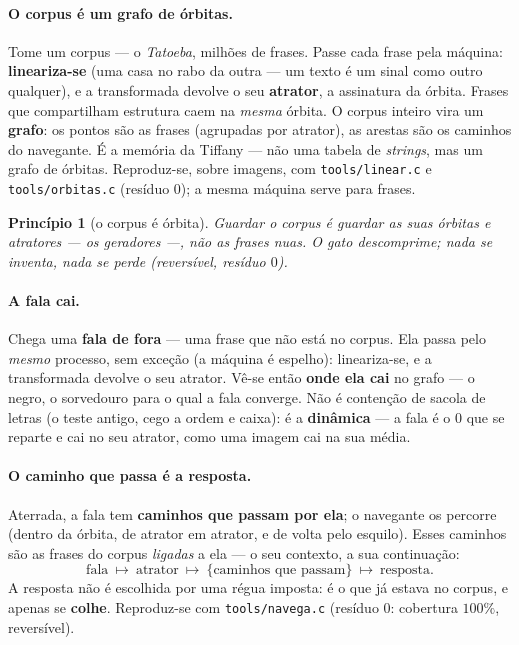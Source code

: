 \documentclass[11pt]{article}
\newcommand{\code}[1]{\texttt{\small #1}}
\theoremstyle{plain}
\newtheorem{principio}{Princípio}
\theoremstyle{remark}
\begin{document}
\paragraph{O corpus é um grafo de órbitas.} Tome um corpus --- o \emph{Tatoeba}, milhões de frases.
Passe cada frase pela máquina: \textbf{lineariza-se} (uma casa no rabo da outra --- um texto é um
sinal como outro qualquer), e a transformada devolve o seu \textbf{atrator}, a assinatura da órbita.
Frases que compartilham estrutura caem na \emph{mesma} órbita. O corpus inteiro vira um
\textbf{grafo}: os pontos são as frases (agrupadas por atrator), as arestas são os caminhos do
navegante. É a memória da Tiffany --- não uma tabela de \emph{strings}, mas um grafo de órbitas.
Reproduz-se, sobre imagens, com \code{tools/linear.c} e \code{tools/orbitas.c} (resíduo $0$); a mesma
máquina serve para frases.

\begin{principio}[o corpus é órbita]
Guardar o corpus é guardar as suas órbitas e atratores --- os geradores ---, não as frases nuas. O
gato descomprime; nada se inventa, nada se perde (reversível, resíduo $0$).
\end{principio}

\paragraph{A fala cai.} Chega uma \textbf{fala de fora} --- uma frase que não está no corpus. Ela
passa pelo \emph{mesmo} processo, sem exceção (a máquina é espelho): lineariza-se, e a transformada
devolve o seu atrator. Vê-se então \textbf{onde ela cai} no grafo --- o negro, o sorvedouro para o
qual a fala converge. Não é contenção de sacola de letras (o teste antigo, cego a ordem e caixa): é
a \textbf{dinâmica} --- a fala é o $0$ que se reparte e cai no seu atrator, como uma imagem cai na
sua média.

\paragraph{O caminho que passa é a resposta.} Aterrada, a fala tem \textbf{caminhos que passam por
ela}; o navegante os percorre (dentro da órbita, de atrator em atrator, e de volta pelo esquilo).
Esses caminhos são as frases do corpus \emph{ligadas} a ela --- o seu contexto, a sua continuação:
\[
 \text{fala}\ \longmapsto\ \text{atrator}\ \longmapsto\ \{\text{caminhos que passam}\}\
 \longmapsto\ \text{resposta}.
\]
A resposta não é escolhida por uma régua imposta: é o que já estava no corpus, e apenas se
\textbf{colhe}. Reproduz-se com \code{tools/navega.c} (resíduo $0$: cobertura $100\%$, reversível).
\end{document}
